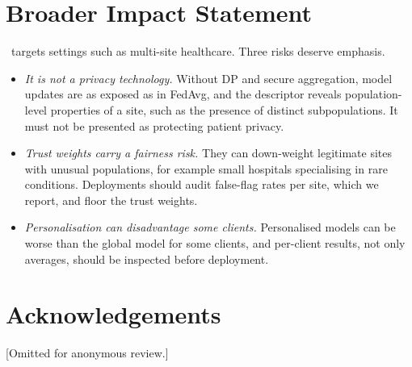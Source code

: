 \section*{Broader Impact Statement}
\ptopofl\ targets settings such as multi-site healthcare. Three risks deserve emphasis.
\begin{itemize}[leftmargin=1.2em,itemsep=2pt]
  \item \emph{It is not a privacy technology.} Without DP and secure aggregation, model
    updates are as exposed as in FedAvg, and the descriptor reveals population-level
    properties of a site, such as the presence of distinct subpopulations. It must not be
    presented as protecting patient privacy.
  \item \emph{Trust weights carry a fairness risk.} They can down-weight legitimate sites
    with unusual populations, for example small hospitals specialising in rare conditions.
    Deployments should audit false-flag rates per site, which we report, and floor the
    trust weights.
  \item \emph{Personalisation can disadvantage some clients.} Personalised models can be
    worse than the global model for some clients, and per-client results, not only
    averages, should be inspected before deployment.
\end{itemize}

\section*{Acknowledgements}
[Omitted for anonymous review.]

\appendix



